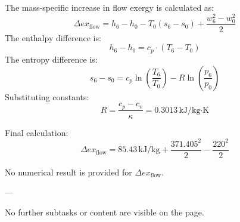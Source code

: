 The mass-specific increase in flow exergy is calculated as:  
\[
\Delta ex_{\text{flow}} = h_6 - h_0 - T_0 (s_6 - s_0) + \frac{w_6^2 - w_0^2}{2}
\]  
The enthalpy difference is:  
\[
h_6 - h_0 = c_p \cdot (T_6 - T_0)
\]  
The entropy difference is:  
\[
s_6 - s_0 = c_p \ln \left( \frac{T_6}{T_0} \right) - R \ln \left( \frac{p_6}{p_0} \right)
\]  
Substituting constants:  
\[
R = \frac{c_p - c_v}{\kappa} = 0.3013 \, \text{kJ/kg·K}
\]  

Final calculation:  
\[
\Delta ex_{\text{flow}} = 85.43 \, \text{kJ/kg} + \frac{371.405^2}{2} - \frac{220^2}{2}
\]  

No numerical result is provided for \( \Delta ex_{\text{flow}} \).  

---

No further subtasks or content are visible on the page.